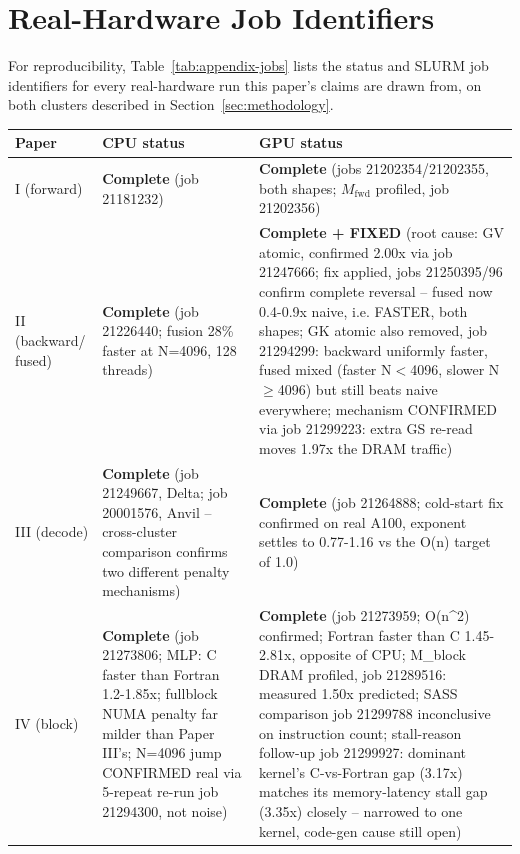 \documentclass[11pt]{article}
\begin{document}
\appendix
\section{Real-Hardware Job Identifiers}
\label{app:jobs}

For reproducibility, Table~\ref{tab:appendix-jobs} lists the status and
SLURM job identifiers for every real-hardware run this paper's claims
are drawn from, on both clusters described in
Section~\ref{sec:methodology}.

\begin{center}
\begin{tabular}{@{}p{2.8cm}p{4.2cm}p{7.5cm}@{}}
\toprule
Paper & CPU status & GPU status \\
\midrule
I (forward) & \textbf{Complete} (job 21181232) & \textbf{Complete} (jobs 21202354/21202355, both shapes; $M_{\mathrm{fwd}}$ profiled, job 21202356) \\
II (backward/ fused) & \textbf{Complete} (job 21226440; fusion 28\% faster at N=4096, 128 threads) & \textbf{Complete + FIXED} (root cause: GV atomic, confirmed 2.00x via job 21247666; fix applied, jobs 21250395/96 confirm complete reversal -- fused now 0.4-0.9x naive, i.e. FASTER, both shapes; GK atomic also removed, job 21294299: backward uniformly faster, fused mixed (faster N$<$4096, slower N$\geq$4096) but still beats naive everywhere; mechanism CONFIRMED via job 21299223: extra GS re-read moves 1.97x the DRAM traffic) \\
III (decode) & \textbf{Complete} (job 21249667, Delta; job 20001576, Anvil -- cross-cluster comparison confirms two different penalty mechanisms) & \textbf{Complete} (job 21264888; cold-start fix confirmed on real A100, exponent settles to 0.77-1.16 vs the O(n) target of 1.0) \\
IV (block) & \textbf{Complete} (job 21273806; MLP: C faster than Fortran 1.2-1.85x; fullblock NUMA penalty far milder than Paper III's; N=4096 jump CONFIRMED real via 5-repeat re-run job 21294300, not noise) & \textbf{Complete} (job 21273959; O(n\textasciicircum{}2) confirmed; Fortran faster than C 1.45-2.81x, opposite of CPU; M\_block DRAM profiled, job 21289516: measured 1.50x predicted; SASS comparison job 21299788 inconclusive on instruction count; stall-reason follow-up job 21299927: dominant kernel's C-vs-Fortran gap (3.17x) matches its memory-latency stall gap (3.35x) closely -- narrowed to one kernel, code-gen cause still open) \\
\bottomrule
\end{tabular}
\label{tab:appendix-jobs}
\end{center}
\end{document}
